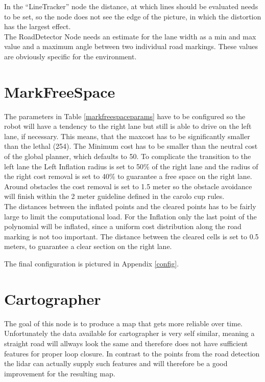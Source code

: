 In the ``LineTracker'' node the distance, at which lines should be evaluated needs to be set, so the node does not see the edge of the picture, in which the distortion has the largest effect.\\


The RoadDetector Node needs an estimate for the lane width as a min and max value and a maximum angle between two individual road markings. These values are obviously specific for the environment.\\

\section{MarkFreeSpace}

The parameters in Table \ref{markfreespaceparams} have to be configured so the robot will have a tendency to the right lane but still is able to drive on the left lane, if necessary. This means, that the maxcost has to be significantly smaller than the lethal (254). The Minimum cost has to be smaller than the neutral cost of the global planner, which defaults to 50. To complicate the transition to the left lane the Left Inflation radius is set to 50\% of the right lane and the radius of the right cost removal  is set to 40\% to guarantee a free space on the right lane.\\

Around obstacles the cost removal is set to 1.5 meter so the obstacle avoidance will finish within the 2 meter guideline defined in the carolo cup rules\cite{carolocup}.\\

The distances between the inflated points and the cleared points has to be fairly large to limit the computational load. For the Inflation only the last point of the polynomial will be inflated, since a uniform cost distribution along the road marking is not too important. The distance between the cleared cells is set to 0.5 meters, to guarantee a clear section on the right lane.

The final configuration is pictured in Appendix \ref{config}.


\section{Cartographer}
The goal of this node is to produce a map that gets more reliable over time.\\

Unfortunately the data available for cartographer is very self similar, meaning a straight road will allways look the same and therefore does not have sufficient features for proper loop closure. In contrast to the points from the road detection the lidar can actually supply such features and will therefore be a good improvement for the resulting map.\\


